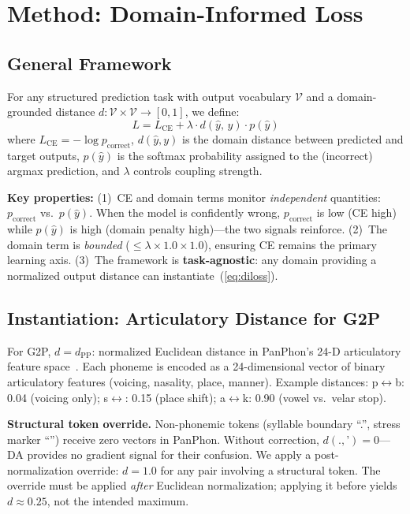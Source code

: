 \documentclass[conference]{IEEEtran}
\newcommand{\dpp}{d_{\mathrm{PP}}}        %
\newcommand{\LCE}{L_{\mathrm{CE}}}        %
\newcommand{\lam}{\lambda}                %
\begin{document}
\section{Method: Domain-Informed Loss}
\label{sec:method}

\subsection{General Framework}

For any structured prediction task with output vocabulary
$\mathcal{V}$ and a domain-grounded distance $d: \mathcal{V}
\times \mathcal{V} \to [0,1]$, we define:
\begin{equation}
  \boxed{L = \LCE + \lam \cdot d(\hat{y},\, y) \cdot p(\hat{y})}
  \label{eq:diloss}
\end{equation}
where $\LCE = -\log p_\mathrm{correct}$,
$d(\hat{y}, y)$ is the domain distance between predicted and target
outputs, $p(\hat{y})$ is the softmax probability assigned to the
(incorrect) argmax prediction, and $\lam$ controls coupling strength.

\textbf{Key properties:}
(1)~CE and domain terms monitor \emph{independent} quantities:
$p_\mathrm{correct}$ vs.\ $p(\hat{y})$.
When the model is confidently wrong, $p_\mathrm{correct}$ is low
(CE high) while $p(\hat{y})$ is high (domain penalty high)---the
two signals reinforce.
(2)~The domain term is \emph{bounded}
($\leq \lam \times 1.0 \times 1.0$), ensuring CE remains the
primary learning axis.
(3)~The framework is \textbf{task-agnostic}: any domain providing
a normalized output distance can instantiate~(\ref{eq:diloss}).

\subsection{Instantiation: Articulatory Distance for G2P}

For G2P, $d = \dpp$: normalized Euclidean distance in PanPhon's
24-D articulatory feature space~\cite{mortensen2016panphon}.
Each phoneme is encoded as a 24-dimensional vector of binary
articulatory features (voicing, nasality, place, manner).
Example distances:
p$\leftrightarrow$b: 0.04 (voicing only);
s$\leftrightarrow$: 0.15 (place shift);
a$\leftrightarrow$k: 0.90 (vowel vs.\ velar stop).

\textbf{Structural token override.}
Non-phonemic tokens (syllable boundary ``.'', stress marker
``'') receive zero vectors in PanPhon.
Without correction, $d(., \text{'}) = 0$---DA provides no gradient
signal for their confusion.
We apply a post-normalization override: $d = 1.0$ for any pair
involving a structural token.
The override must be applied \emph{after} Euclidean normalization;
applying it before yields $d\!\approx\!0.25$, not the intended
maximum.
\end{document}
